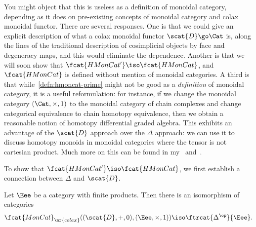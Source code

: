 You might object that this is useless as a definition of monoidal category,
depending as it does on pre-existing concepts of monoidal category and
colax monoidal functor.  There are several responses.  One is that we could
give an explicit description of what a colax monoidal functor $\scat{D} \go
\Cat$ is, along the lines of the traditional description of cosimplicial
objects by face and degeneracy maps, and this would eliminate the
dependence.  Another is that we will soon show that $\fcat{HMonCat'} \iso
\fcat{HMonCat}$, and $\fcat{HMonCat}$ is defined without mention of
monoidal categories.  A third is that while~\ref{defn:hmoncat-prime} might
not be good as a \emph{definition} of monoidal category, it is a useful
reformulation: for instance, if we change the monoidal category
$(\Cat,\times,1)$ to the monoidal category of chain
complexes and change
categorical equivalence to chain homotopy equivalence, then we obtain a
reasonable notion of homotopy%
%
%
%
%
%
%
differential%
%  
% 
graded algebra.  This exhibits an advantage of the $\scat{D}$ approach over
the $\Delta$ approach: we can use it to discuss homotopy monoids in
monoidal categories where the tensor is not cartesian product.  Much more
on this can be found in my~\cite{UTHM} and~\cite{HAO}.

To show that $\fcat{HMonCat'} \iso \fcat{HMonCat}$, we first establish a
connection between $\Delta$ and $\scat{D}$.

\begin{propn}	
Let $\Eee$ be a category with finite products.  Then there is an
isomorphism of categories
\[
\fcat{MonCat}_\mr{colax}((\scat{D},+,0), (\Eee,\times,1))
\iso
\ftrcat{\Delta^\op}{\Eee}.
\]
\end{propn}

